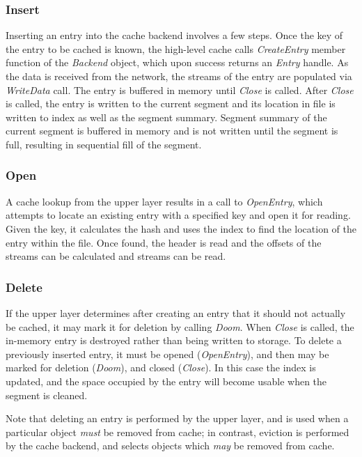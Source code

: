 \documentclass[letterpaper,twocolumn,10pt]{article}
\begin{document}
\subsubsection{Insert}
Inserting an entry into the cache backend involves a few steps.  Once the key of
the entry to be cached is known, the high-level cache calls \emph{CreateEntry}
member function of the \emph{Backend} object, which upon success returns an
\emph{Entry} handle.  As the data is received from the network, the streams of
the entry are populated via \emph{WriteData} call.  The entry is buffered in
memory until \emph{Close} is called.  After \emph{Close} is called, the entry is
written to the current segment and its location in file is written to index as
well as the segment summary.  Segment summary of the current segment is buffered
in memory and is not written until the segment is full, resulting in sequential
fill of the segment.

\subsubsection{Open}
A cache lookup from the upper layer results in a call to \emph{OpenEntry}, which
attempts to locate an existing entry with a specified key and open it for
reading.  Given the key, it calculates the hash and uses the index to find the
location of the entry within the file.  Once found, the header is read and the
offsets of the streams can be calculated and streams can be read.

\subsubsection{Delete}
If the upper layer determines after creating an entry that it should not
actually be cached, it may mark it for deletion by calling \emph{Doom}.  When
\emph{Close} is called, the in-memory entry is destroyed rather than being
written to storage.  To delete a previously inserted entry, it must be opened
(\emph{OpenEntry}), and then may be marked for deletion (\emph{Doom}), and
closed (\emph{Close}).  In this case the index is updated, and the space
occupied by the entry will become usable when the segment is cleaned.


Note that deleting an entry is performed by the upper layer, and is used when a
particular object \emph{must} be removed from cache; in contrast, eviction is
performed by the cache backend, and selects objects which \emph{may} be removed
from cache.
\end{document}

